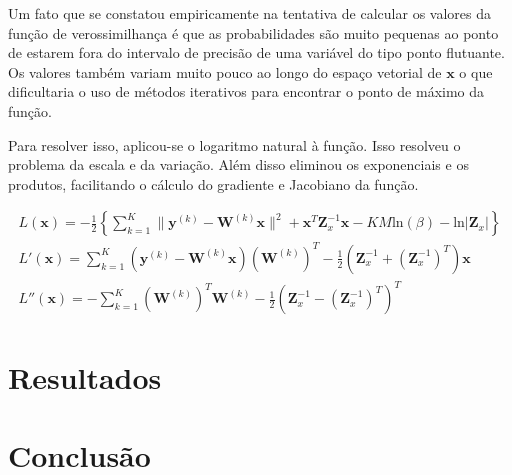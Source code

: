 \documentclass[12pt,openright,oneside,a4paper,english,brazil]{abntex2}
\begin{document}
Um fato que se constatou empiricamente na tentativa de calcular os valores da função de verossimilhança é que as probabilidades são muito pequenas ao ponto de estarem fora do intervalo de precisão de uma variável do tipo ponto flutuante.
Os valores também variam muito pouco ao longo do espaço vetorial de $\mathbf{x}$ o que dificultaria o uso de métodos iterativos para encontrar o ponto de máximo da função.

Para resolver isso, aplicou-se o logaritmo natural à função. Isso resolveu o problema da escala e da variação.
Além disso eliminou os exponenciais e os produtos, facilitando o cálculo do gradiente e Jacobiano da função.

\begin{gather}
	L(\mathbf{x}) = -\frac{1}{2} \left\{ \sum^K_{k=1} \|\mathbf{y}^{(k)} - \mathbf{W}^{(k)} \mathbf{x} \|^2 + \mathbf{x}^T\mathbf{Z}^{-1}_x\mathbf{x} - KM\mathrm{ln}(\beta) - \mathrm{ln}|\mathbf{Z}_x| \right\} \\ 
	L'(\mathbf{x}) =  \sum^K_{k=1}  (\mathbf{y}^{(k)} - \mathbf{W}^{(k)}\mathbf{x})(\mathbf{W}^{(k)})^T  - \frac{1}{2}(\mathbf{Z}^{-1}_x + (\mathbf{Z}^{-1}_x)^T)\mathbf{x}  \\
	L''(\mathbf{x}) =  -\sum^K_{k=1} (\mathbf{W}^{(k)})^T\mathbf{W}^{(k)} - \frac{1}{2}(\mathbf{Z}^{-1}_x - (\mathbf{Z}^{-1}_x)^T)^T
\end{gather}


\chapter{Resultados}

\chapter{Conclusão}

\postextual



\end{document}
